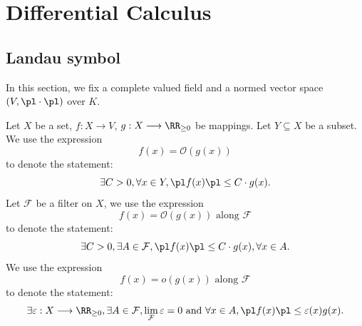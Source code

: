 \chapter{Differential Calculus}
\section{Landau symbol}
\quad In this section, we fix a complete valued field  and a normed vector space $(V,\pl\cdot\pl)$ over $K$.
\begin{definitionenv}
    Let $X$ be a set, $f:X\longrightarrow V$, $g:X\longrightarrow \RR_{\ge 0}$ be mappings. 
    \newline
    \quad Let $Y\subseteq X$ be a subset. We use the expression 
    $$f(x)=\mathcal{O}(g(x))$$ to denote the statement:
    $$\exists C>0, \forall x\in Y, \pl f(x)\pl \le C\cdot g(x).$$
    \quad Let $\mathcal{F}$ be a filter on $X$, we use the expression 
    $$f(x)=\mathcal{O}\left(g(x)\right) \text{ along } \mathcal{F}$$ to denote the statement:
    $$\exists C>0, \exists A\in \mathcal{F}, \pl f(x)\pl\le C\cdot g(x), \forall x\in A.$$
    We use the expression 
    $$f(x)=o\left(g(x)\right)\text{ along }\mathcal{F}$$ to denote the statement: 
    $$\exists \varepsilon:X\longrightarrow \RR_{\ge 0}, \exists A\in \mathcal{F}, \lim_{\mathcal{F}}\varepsilon=0 \text{ and }\forall x\in A, \pl f(x)\pl\le \varepsilon(x)g(x).$$
\end{definitionenv}
